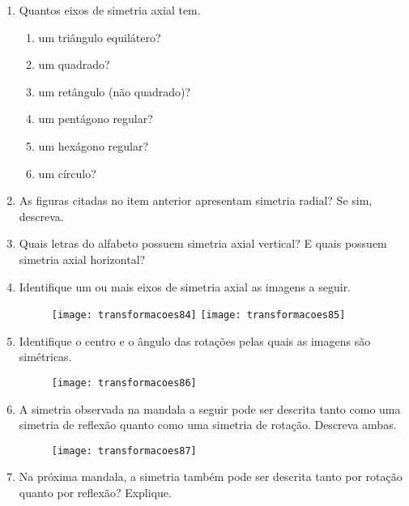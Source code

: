 \begin{enumerate}
\item Quantos eixos de simetria axial tem.
\begin{enumerate}
\item um triângulo equilátero?
\item um quadrado?
\item um retângulo (não quadrado)?
\item um pentágono regular?
\item um hexágono regular?
\item um círculo?
\end{enumerate}


\item As figuras citadas no item anterior apresentam simetria radial? Se sim, descreva.

\item Quais letras do alfabeto possuem simetria axial vertical? E quais possuem simetria axial horizontal?

\item Identifique um ou mais eixos de simetria axial as imagens a seguir. 

\begin{figure}[H]
\centering

\texttt{[image: transformacoes84]}
\hspace{2em}
\texttt{[image: transformacoes85]}
\end{figure}

\item Identifique o centro e o ângulo das rotações pelas quais as imagens são simétricas. 

\begin{figure}[H]
\centering

\texttt{[image: transformacoes86]}
\hspace{2em}
\end{figure}

\item A simetria observada na mandala a seguir pode ser descrita tanto como uma simetria de reflexão quanto como uma simetria de rotação.  Descreva ambas.

\begin{figure}[H]
\centering

\texttt{[image: transformacoes87]}
\end{figure}

\item Na próxima mandala, a simetria também pode ser descrita tanto por rotação quanto por reflexão? Explique. 


\end{enumerate}
